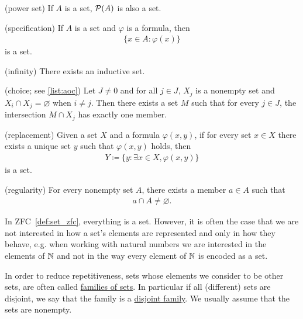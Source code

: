 \begin{definition}
\begin{description}
    (power set) If $A$ is a set, $\operatorname{\mathcal P}(A)$ is also a set.

    (specification) If $A$ is a set and $\varphi$ is a formula, then
    \begin{align*}
      \{ x \in A \colon \varphi(x) \}
    \end{align*}
    is a set.

    (infinity) There exists an inductive set.

    (choice; see \cref{list:aoc}) Let $J \neq 0$ and for all $j \in J$, $X_j$ is a nonempty set and $X_i \cap X_j = \varnothing$ when $i \neq j$. Then there exists a set $M$ such that for every $j \in J$, the intersection $M \cap X_j$ has exactly one member.

    (replacement) Given a set $X$ and a formula $\varphi(x, y)$, if for every set $x \in X$ there exists a unique set $y$ such that $\varphi(x, y)$ holds, then
    \begin{align*}
      Y \coloneqq \{ y \colon \exists x \in X, \varphi(x, y) \}
    \end{align*}
    is a set.

    (regularity) For every nonempty set $A$, there exists a member $a \in A$ such that
    \begin{align*}
      a \cap A \neq \varnothing.
    \end{align*}
  \end{description}
\end{definition}

\begin{note}\label{note:family_of_sets}
  In ZFC~\cref{def:set_zfc}, everything is a set. However, it is often the case that we are not interested in how a set's elements are represented and only in how they behave, e.g. when working with natural numbers we are interested in the elements of $\mathbb N$ and not in the way every element of $\mathbb N$ is encoded as a set.

  In order to reduce repetitiveness, sets whose elements we consider to be other sets, are often called \uline{families of sets}. In particular if all (different) sets are disjoint, we say that the family is a \uline{disjoint family}. We usually assume that the sets are nonempty.
\end{note}

